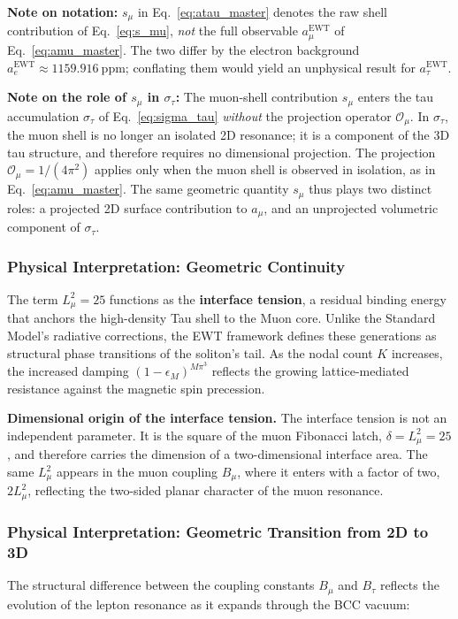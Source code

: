 \documentclass[10pt,a4paper]{article}
\begin{document}
\smallskip
\noindent
\textbf{Note on notation:} $s_\mu$ in Eq.~\eqref{eq:atau_master} denotes the
raw shell contribution of Eq.~\eqref{eq:s_mu}, \emph{not} the full observable
$a_\mu^{\text{EWT}}$ of Eq.~\eqref{eq:amu_master}. The two differ by the
electron background $a_e^{\text{EWT}} \approx 1159.916\ \text{ppm}$; conflating
them would yield an unphysical result for $a_\tau^{\text{EWT}}$.

\smallskip
\noindent
\textbf{Note on the role of $s_\mu$ in $\sigma_\tau$:}
The muon-shell contribution $s_\mu$ enters the tau accumulation
$\sigma_\tau$ of Eq.~\eqref{eq:sigma_tau} \emph{without} the projection
operator $\mathcal{O}_\mu$. In $\sigma_\tau$, the muon shell is no longer
an isolated 2D resonance; it is a component of the 3D tau structure, and
therefore requires no dimensional projection. The projection
$\mathcal{O}_\mu = 1/(4\pi^2)$ applies only when the muon shell is
observed in isolation, as in Eq.~\eqref{eq:amu_master}. The same
geometric quantity $s_\mu$ thus plays two distinct roles: a projected
2D surface contribution to $a_\mu$, and an unprojected volumetric
component of $\sigma_\tau$.

\subsubsection*{Physical Interpretation: Geometric Continuity}
\label{sec:interface_tension}
The term $L_{\mu}^2 = 25$ functions as the \textbf{interface tension}, a residual binding energy that anchors the high-density Tau shell to the Muon core. Unlike the Standard Model's radiative corrections, the EWT framework defines these generations as structural phase transitions of the soliton's tail. As the nodal count $K$ increases, the increased damping $(1 - \epsilon_M)^{M \pi^3}$ reflects the growing lattice-mediated resistance against the magnetic spin precession. 

\textbf{Dimensional origin of the interface tension.}
The interface tension is not an independent parameter. It is the square
of the muon Fibonacci latch, $\delta = L_\mu^2 = 25$, and therefore
carries the dimension of a two-dimensional interface area. The same
$L_\mu^2$ appears in the muon coupling $B_\mu$, where it enters with a
factor of two, $2L_\mu^2$, reflecting the two-sided planar character of
the muon resonance.

\subsubsection*{Physical Interpretation: Geometric Transition from 2D to 3D}
The structural difference between the coupling constants $B_{\mu}$ and $B_{\tau}$ reflects the evolution of the lepton resonance as it expands through the BCC vacuum:
\end{document}
